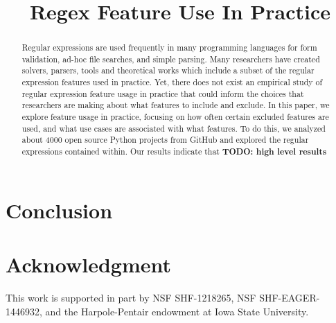 \documentclass[conference]{IEEEtran}
\newcommand{\todo}[1]{\textbf{TODO: #1}}
\begin{document}
%
\title{Regex Feature Use In Practice}


\author{
}

\maketitle


\begin{abstract}
Regular expressions are used frequently in many programming languages for form validation,
ad-hoc file searches, and simple parsing. Many researchers have created solvers, parsers, tools and theoretical works which include a subset of the regular expression features used in practice. Yet, there does not exist an empirical study of regular expression feature usage in practice that could inform the choices that researchers are making about what features to include and exclude. In this paper, we explore feature usage in practice, focusing on how often certain excluded features are used, and what use cases are associated with what features. To do this, we analyzed about 4000 open source Python projects from GitHub and explored the regular expressions contained within. Our results indicate that \todo{high level results}
\end{abstract}

















\section{Conclusion}


\section*{Acknowledgment}
This work is supported in part by NSF SHF-1218265, NSF SHF-EAGER-1446932, and the Harpole-Pentair endowment at Iowa State University.






\balance


\end{document}
